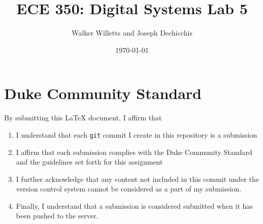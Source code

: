 \documentclass[letterpaper]{article} %
\begin{document}
\title{ECE 350: Digital Systems Lab 5}
\author{Walker Willetts and Joseph Dechicchis} %
\date{\today} %
\maketitle

\section*{Duke Community Standard}

By submitting this \LaTeX{} document, I affirm that
\begin{enumerate}
    \item I understand that each \texttt{git} commit I create in this repository is a submission
    \item I affirm that each submission complies with the Duke Community Standard and the guidelines set forth for this assignment
    \item I further acknowledge that any content not included in this commit under the version control system cannot be considered as a part of my submission.
    \item Finally, I understand that a submission is considered submitted when it has been pushed to the server.
\end{enumerate}
\newpage
\end{document}
